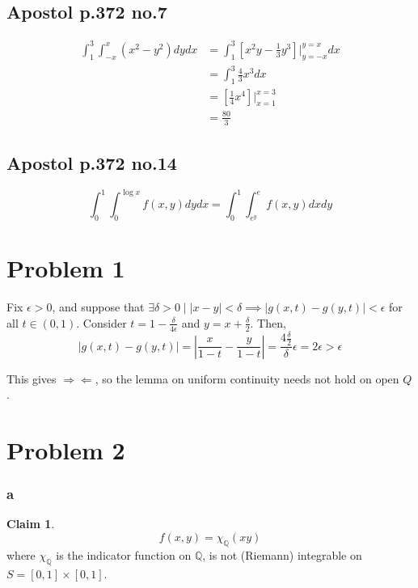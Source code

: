 \documentclass[12pt,letterpaper]{article}
\theoremstyle{definition}
\newtheorem*{claim}{Claim}
\newcommand{\contra}{\Rightarrow\!\Leftarrow}
\newcommand{\Q}{\mathbb{Q}}
\begin{document}
\subsection*{Apostol p.372 no.7}

\begin{align*}
  \int_{1}^{3}\int_{-x}^x(x^2-y^2)dydx &= \int_1^3\left[ x^2y - \frac{1}{3}y^3 \right]\Big|_{y=-x}^{y=x}dx \\
                                       &= \int_1^3 \frac{4}{3}x^3dx \\
                                       &= \left[ \frac{1}{4}x^4 \right]\Big|_{x=1}^{x=3} \\
                                       &= \frac{80}{3} 
\end{align*}

\subsection*{Apostol p.372 no.14}

\[
  \int_0^1\int_0^{\log{x}}f(x,y)dydx = \int_0^1\int_{e^y}^ef(x,y)dxdy
\]

\section*{Problem 1}

Fix $\epsilon > 0$, and suppose that $\exists \delta > 0 \mid |x - y| < \delta
\implies |g(x,t) - g(y,t)| < \epsilon$ for all $t \in (0,1)$. Consider $t = 1 -
\frac{\delta}{4\epsilon}$ and $y = x + \frac{\delta}{2}$. Then,
\[
  \left|g(x,t) - g(y,t)\right| = \left|\frac{x}{1-t} - \frac{y}{1-t}\right| =
  \frac{4\frac{\delta}{2}}{\delta}\epsilon = 2\epsilon > \epsilon
\]

This gives $\contra$, so the lemma on uniform continuity needs not hold on open $Q$.

\section*{Problem 2}

\subsubsection*{a}

\begin{claim}
  \[
    f(x,y) = \chi_{\Q}(xy)
  \]
  where $\chi_\Q$ is the indicator function on $\Q$,
  is not (Riemann) integrable on $S = [0,1] \times [0,1]$. 
\end{claim}
\end{document}
